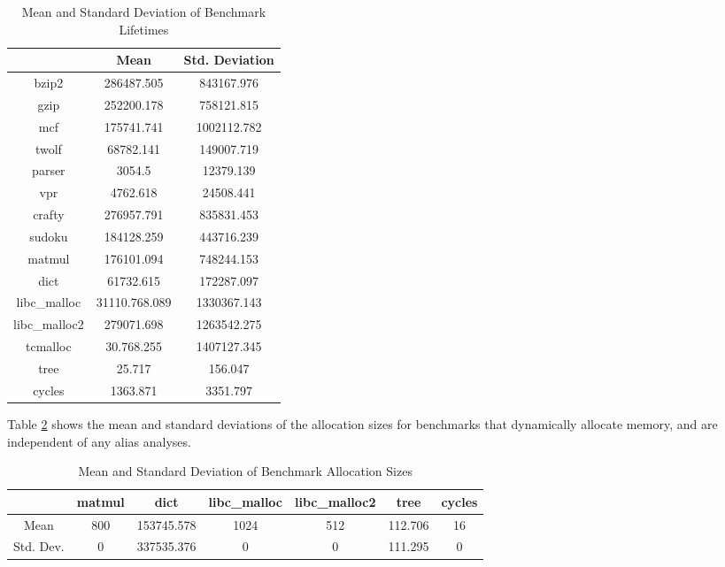 \begin{table} [h!]
\centering
   \begin{tabular} {|c|c c|}
      \hline
      & Mean & Std. Deviation \\
      \hline
	   bzip2 & 286487.505 & 843167.976 \\
      \hline
	   gzip & 252200.178 & 758121.815 \\
      \hline
           mcf & 175741.741 & 1002112.782 \\
      \hline
	   twolf & 68782.141 & 149007.719 \\
      \hline
	   parser & 3054.5 & 12379.139 \\
      \hline
	   vpr & 4762.618 & 24508.441 \\
      \hline
	   crafty & 276957.791 & 835831.453 \\
      \hline
	   sudoku & 184128.259 & 443716.239 \\
      \hline
	   matmul & 176101.094 & 748244.153 \\
      \hline
	   dict & 61732.615 & 172287.097 \\
      \hline
	   libc\_malloc & 31110.768.089 & 1330367.143 \\
      \hline
	   libc\_malloc2 & 279071.698 & 1263542.275 \\
      \hline
	   tcmalloc & 30.768.255 & 1407127.345 \\
      \hline
	   tree & 25.717 & 156.047 \\
      \hline
	   cycles & 1363.871 & 3351.797 \\
      \hline
   \end{tabular}
   \caption{Mean and Standard Deviation of Benchmark Lifetimes}
   \label{table:4}
\end{table}

\newpage

Table \ref{table:5} shows the mean and standard deviations of the allocation sizes for benchmarks that dynamically allocate memory, and are independent of any alias analyses.

\begin{table} [h!]
\centering
   \begin{tabular} {|c|c c c c c c|}
      \hline
      & matmul & dict & libc\_malloc & libc\_malloc2 & tree & cycles \\
      \hline
      Mean & 800 & 153745.578 & 1024 & 512 & 112.706 & 16 \\
      \hline
      Std. Dev. & 0 & 337535.376 & 0 & 0 & 111.295 & 0 \\
      \hline
   \end{tabular}
   \caption{Mean and Standard Deviation of Benchmark Allocation Sizes}
   \label{table:5}
\end{table}

